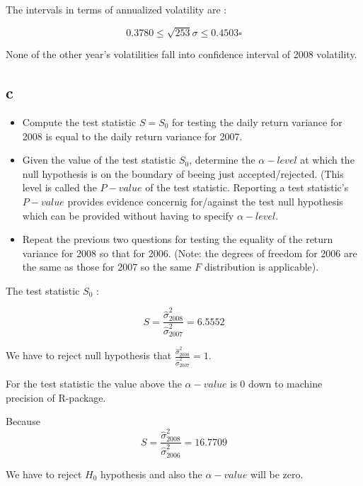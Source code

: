 \begin{solution}
The intervals in terms of annualized volatility are :

\begin{equation}
 0.3780 \leq \sqrt{253}\sigma \leq 0.4503 \square
\end{equation}

None of the other year's volatilities  fall into confidence interval of 2008 volatility.
\end{solution}

\subsection{c}
\label{subsection_4_c}

\begin{itemize}
\item Compute the test statistic $S=S_0$ for testing the daily return variance for 2008 is equal to the daily return variance for 2007.

\item Given the value of the test statistic $S_0$, determine the $\alpha-\textit{level}$ at which the null hypothesis is on the boundary 
of beeing just accepted/rejected.
(This level is called the $P-\textit{value}$ of the test statistic. Reporting a test statistic's $P-\textit{value}$ provides evidence 
concernig for/against the test null hypothesis which can be provided without having to specify $\alpha-\textit{level}$.

\item Repeat the previous two questions for testing the equality of the return variance for 2008 so that for 2006. (Note: the degrees of 
freedom for 2006 are the same as those for 2007 so the same $F$ distribution is applicable).
\end{itemize}

\begin{solution}
The test statistic $S_0$ :

\begin{equation}
S=\frac{\hat{\sigma}_{2008}^2}{\hat{\sigma}_{2007}^2} = 6.5552
\end{equation}

We have to reject null hypothesis that $\frac{\hat{\sigma}_{2008}^2}{\hat{\sigma}_{2007}^2} = 1$.

\end{solution}

\begin{solution}
For the test statistic the value above the $\alpha-\textit{value}$ is 0 down to machine precision of R-package.

\end{solution}


\begin{solution}
Because
\begin{equation}
S=\frac{\hat{\sigma}_{2008}^2}{\hat{\sigma}_{2006}^2} = 16.7709
\end{equation}

We have to reject $H_0$ hypothesis and also the $\alpha-\textit{value}$ will be zero.
\end{solution}